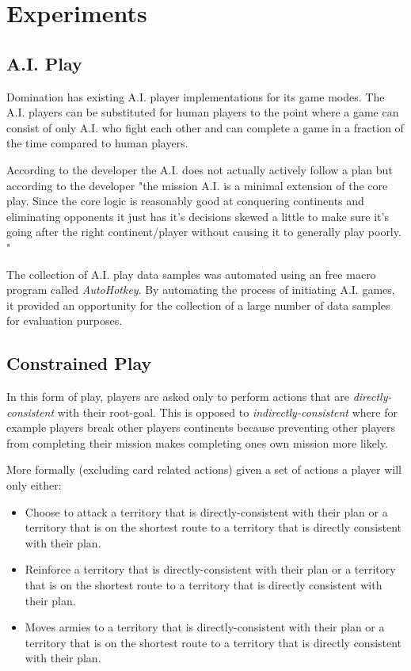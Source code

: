 \documentclass[parskip]{cs4rep}
\begin{document}
\section{Experiments}

\subsection{A.I. Play}

Domination has existing A.I. player implementations for its game modes. The A.I. players can be substituted for human players to the point where a game can consist of only A.I. who fight each other and can complete a game in a fraction of the time compared to human players. 

According to the developer the A.I. does not actually actively follow a plan but according to the developer "the mission A.I. is a minimal extension of the core play. Since the core logic is reasonably good at conquering continents and eliminating opponents it just has it's decisions skewed a little to make sure it's going after the right continent/player without causing it to generally play poorly. "

The collection of A.I. play data samples was automated using an free macro program called \textit{AutoHotkey}. By automating the process of initiating A.I. games, it provided an opportunity for the collection of a large number of data samples for evaluation purposes. 

\subsection{Constrained Play}

In this form of play, players are asked only to perform actions that are \textit{directly-consistent} with their root-goal. This is opposed to \textit{indirectly-consistent} where for example players break other players continents because preventing other players from completing their mission makes completing ones own mission more likely.

More formally (excluding card related actions) given a set of actions a player will only either:

\begin{itemize}
\item
Choose to attack a territory that is directly-consistent with their plan or a territory that is on the shortest route to a territory that is directly consistent with their plan.
\item
Reinforce a territory that is directly-consistent with their plan or a territory that is on the shortest route to a territory that is directly consistent with their plan.
\item
Moves armies to a territory that is directly-consistent with their plan or a territory that is on the shortest route to a territory that is directly consistent with their plan.
\end{itemize}
\end{document}

